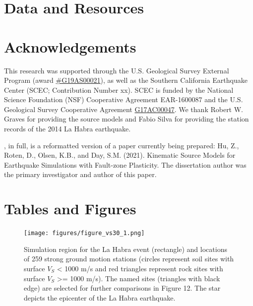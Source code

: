 

\section*{Data and Resources}


\section*{Acknowledgements}

This research was supported through the U.S. Geological Survey External Program (award \url{\#G19AS00021}), as well as the Southern California Earthquake Center (SCEC; Contribution Number xx). SCEC is funded by the National Science Foundation (NSF) Cooperative Agreement EAR-1600087 and the U.S. Geological Survey Cooperative Agreement \url{G17AC00047}. We thank Robert W. Graves for providing the source models and Fabio Silva for providing the station records of the 2014 La Habra earthquake.

, in full, is a reformatted version of a paper currently being prepared: Hu, Z., Roten, D., Olsen, K.B., and Day, S.M. (2021). Kinematic Source Models for Earthquake Simulations with Fault-zone Plasticity. The dissertation author was the primary investigator and author of this paper.


\newpage
\section*{Tables and Figures}
%





\clearpage
\begin{figure}[!ht]
    \centering
    \texttt{[image: figures/figure\_vs30\_1.png]}
    \caption{Simulation region for the La Habra event (rectangle) and locations of 259 strong ground motion stations (circles represent soil sites with surface $V_S$ < 1000 m/s and red triangles represent rock sites with surface $V_S$ >= 1000 m/s). The named sites (triangles with black edge) are selected for further comparisons in Figure 12. The star depicts the epicenter of the La Habra earthquake.
    }
    \label{fig:eks-1}
\end{figure}


